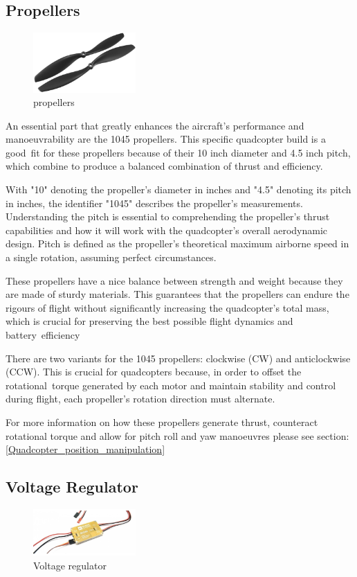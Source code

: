 \documentclass{article}
\begin{document}
\subsection{Propellers}
\begin{figure}[H]
  \centering
  \includegraphics[width=0.35\textwidth]{Pictures/props.png}
  \caption{propellers}
  \label{fig:propellers}
\end{figure}
An essential part that greatly enhances the aircraft's performance and manoeuvrability are the 1045 propellers. This specific quadcopter build is a good fit for these propellers because of their 10 inch diameter and 4.5 inch pitch, which combine to produce a balanced combination of thrust and efficiency. 

With "10" denoting the propeller's diameter in inches and "4.5" denoting its pitch in inches, the identifier "1045" describes the propeller's measurements. Understanding the pitch is essential to comprehending the propeller's thrust capabilities and how it will work with the quadcopter's overall aerodynamic design. Pitch is defined as the propeller's theoretical maximum airborne 
speed in a single rotation, assuming perfect circumstances.

These propellers have a nice balance between strength and weight because they are made of sturdy materials. This guarantees that the propellers can endure the rigours of flight without significantly increasing the quadcopter's total mass, which is crucial for preserving the best possible flight dynamics and battery efficiency 

There are two variants for the 1045 propellers: clockwise (CW) and anticlockwise (CCW). This is crucial for quadcopters because, in order to offset the rotational torque generated by each motor and maintain stability and control during flight, each propeller's rotation direction must alternate.

For more information on how these propellers generate thrust, counteract rotational torque and allow for pitch roll and yaw manoeuvres please see section:\ref{Quadcopter_position_manipulation}
\subsection{Voltage Regulator}
\begin{figure}[H]
  \centering
  \includegraphics[width=0.35\textwidth]{Pictures/voltage_regulator.png}
  \caption{Voltage regulator}
  \label{fig:voltage_regulator}
\end{figure}
\end{document}
